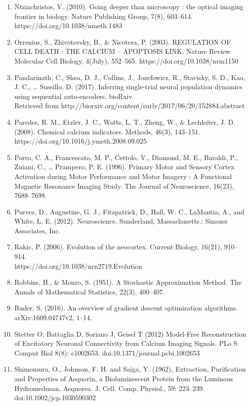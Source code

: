 \documentclass[11pt]{article}
\begin{document}
\begin{enumerate}
\item Ntziachristos, V. (2010). Going deeper than microscopy : the optical imaging frontier in biology. Nature Publishing Group, 7(8), 603–614. https://doi.org/10.1038/nmeth.1483
\item Orrenius, S., Zhivotovsky, B., \& Nicotera, P. (2003). REGULATION OF CELL DEATH : THE CALCIUM – APOPTOSIS LINK. Nature Review Molecular Cell Biology, 4(July), 552–565. https://doi.org/10.1038/nrm1150
\item Pandarinath, C., Shea, D. J., Collins, J., Jozefowicz, R., Stavisky, S. D., Kao, J. C., … Sussillo, D. (2017). Inferring single-trial neural population dynamics using sequential auto-encoders. bioRxiv.\\Retrieved from http://biorxiv.org/content/early/2017/06/20/152884.abstract
\item Paredes, R. M., Etzler, J. C., Watts, L. T., Zheng, W., \& Lechleiter, J. D. (2008). Chemical calcium indicators. Methods, 46(3), 143–151. https://doi.org/10.1016/j.ymeth.2008.09.025
\item Porro, C. A., Francescato, M. P., Cettolo, V., Diamond, M. E., Baraldi, P., Zuiani, C., … Prampero, P. E. (1996). Primary Motor and Sensory Cortex Activation during Motor Performance and Motor Imagery : A Functional Magnetic Resonance Imaging Study. The Journal of Neuroscience, 16(23), 7688–7698.
\item Purves, D., Augustine, G. J., Fitzpatrick, D., Hall, W. C., LaMantia, A., and White, L. E. (2012). Neuroscience. Sunderland, Massachusetts.: Sinauer Associates, Inc.
\item Rakic, P. (2006). Evolution of the neocortex. Current Biology, 16(21), 910–914. \\https://doi.org/10.1038/nrn2719.Evolution
\item Robbins, H., \& Monro, S. (1951). A Stochastic Approximation Method. The Annals of Mathematical Statistics, 22(3), 400–407.
\item Ruder, S. (2016). An overview of gradient descent optimization algorithms.\\ arXiv:1609.04747v2, 1–14.
\item Stetter  O,  Battaglia  D,  Soriano  J,  Geisel  T  (2012)  Model-Free  Reconstruction  of  Excitatory  Neuronal  Connectivity  from  Calcium  Imaging  Signals.  PLo S Comput  Biol  8(8):  e1002653. doi:10.1371/journal.pcbi.1002653
\item Shimomura, O., Johnson, F. H. and Saiga, Y. (1962), Extraction, Purification and Properties of Aequorin, a Bioluminescent Protein from the Luminous Hydromedusan, Aequorea. J. Cell. Comp. Physiol., 59: 223–239. doi:10.1002/jcp.1030590302

\end{enumerate}
\end{document}
